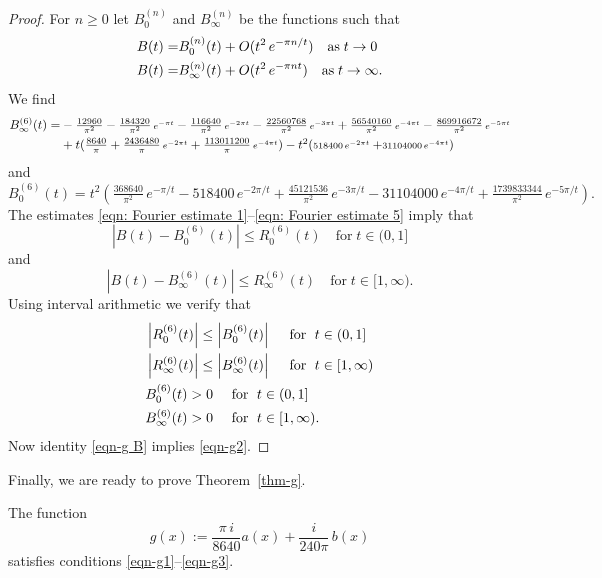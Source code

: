 \begin{proof}
\noindent For $n\geq 0$ let $B_0^{(n)}$ and  $B_{\infty}^{(n)}$ be the functions  such that
\begin{align}
  B(t)=&B_0^{(n)}(t)+O(t^2\,e^{-\pi n /t})\quad\mbox{as}\;t\to0\notag\\
  B(t)=&B_\infty^{(n)}(t)+O(t^2\,e^{-\pi n t})\quad\mbox{as}\;t\to\infty.\notag
\end{align}
We find
\begin{align}B_\infty^{(6)}(t)=&-\tfrac{12960}{\pi ^2}-\tfrac{184320}{\pi ^2}\,\scriptstyle e^{-\pi  t}\displaystyle-\tfrac{116640}{\pi ^2} \,\scriptstyle e^{-2\pi  t}\displaystyle-\tfrac{22560768}{\pi ^2}\,\scriptstyle e^{-3\pi  t}\displaystyle+\tfrac{56540160}{\pi ^2}\,\scriptstyle e^{-4\pi  t}\displaystyle-\tfrac{869916672 }{\pi ^2} \,\scriptstyle e^{-5\pi  t}\displaystyle\notag\\
&+t(\tfrac{8640 }{\pi }+\tfrac{2436480}{\pi }\,\scriptstyle e^{-2\pi  t}\displaystyle+\tfrac{113011200 }{\pi }\,\scriptstyle e^{-4\pi  t}\textstyle)-t^2(\scriptstyle518400\,\scriptstyle e^{-2\pi  t}\displaystyle+\scriptstyle31104000\,\scriptstyle e^{-4\pi  t}\displaystyle)\notag
\end{align}
and
$$B_0^{(6)}(t)= t^2(\tfrac{368640}{\pi ^2}\, e^{-\pi/t}-518400\, e^{-2 \pi /t}+\tfrac{45121536 }{\pi ^2}\,e^{-3 \pi/t}-31104000\, e^{-4 \pi/t}+\tfrac{1739833344 }{\pi ^2}\,e^{-5 \pi/t}) .$$
The estimates \eqref{eqn: Fourier estimate 1}--\eqref{eqn: Fourier estimate 5} imply that $$\left|B(t)-B_0^{(6)}(t)\right|\leq R_0^{(6)}(t)\quad\mbox{for}\;t\in(0,1]$$
and
$$\left|B(t)-B_\infty^{(6)}(t)\right|\leq R_\infty^{(6)}(t)\quad\mbox{for}\;t\in[1,\infty).$$
Using interval arithmetic we verify that
\begin{align}
&\left|R_0^{(6)}(t)\right|\leq\left|B_0^{(6)}(t)\right|\quad\mbox{ for }\;t\in(0,1]\notag \\
&\left|R_\infty^{(6)}(t)\right|\leq\left|B_\infty^{(6)}(t)\right|\quad\mbox{ for }\;t\in[1,\infty)\notag \\
&B_0^{(6)}(t)>0\quad\mbox{ for }\;t\in(0,1]\notag \\
&B_\infty^{(6)}(t)>0\quad\mbox{ for }\;t\in[1,\infty). \notag
\end{align}
Now identity \eqref{eqn-g B} implies \eqref{eqn-g2}.
\end{proof}
Finally, we are ready to prove Theorem~\ref{thm-g}.
\begin{theorem}\label{thm-g1}
The function
$$g(x):=\frac{\pi\,i}{8640}a(x)+\frac{i}{240\pi}\,b(x)$$
satisfies conditions \eqref{eqn-g1}--\eqref{eqn-g3}.
\end{theorem}

